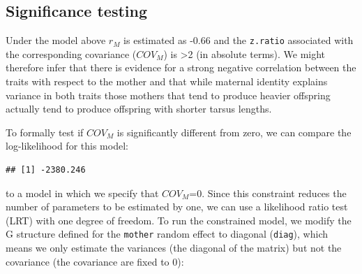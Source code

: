 \documentclass[
  12pt,
]{book}
\newenvironment{Shaded}{\begin{snugshade}}{\end{snugshade}}
\newcommand{\NormalTok}[1]{#1}
\newcommand{\SpecialCharTok}[1]{\textcolor[rgb]{0.00,0.00,0.00}{#1}}
\begin{document}
\hypertarget{significance-testing}{%
\subsection{Significance testing}\label{significance-testing}}

Under the model above \(r_M\) is estimated as -0.66 and the \texttt{z.ratio} associated with the corresponding covariance (\(COV_M\)) is \textgreater2 (in absolute terms). We might therefore infer that there is evidence for a strong negative correlation between the traits with respect to the mother and that while maternal identity explains variance in both traits those mothers that tend to produce heavier offspring actually tend to produce offspring with shorter tarsus lengths.

To formally test if \(COV_M\) is significantly different from zero, we can compare the log-likelihood for this model:

\begin{Shaded}
\end{Shaded}

\begin{verbatim}
## [1] -2380.246
\end{verbatim}

to a model in which we specify that \(COV_M\)=0. Since this constraint reduces the number of parameters to be estimated by one, we can use a likelihood ratio test (LRT) with one degree of freedom. To run the constrained model, we modify the G structure defined for the \texttt{mother} random effect to diagonal (\texttt{diag}), which means we only estimate the variances (the diagonal of the matrix) but not the covariance (the covariance are fixed to 0):
\end{document}
